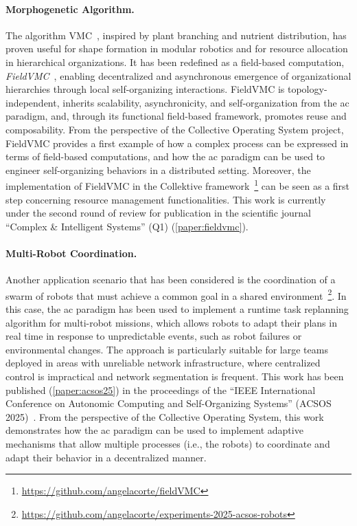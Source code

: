 \documentclass[runningheads]{llncs}
\begin{document}
    \paragraph{Morphogenetic Algorithm.}
    The algorithm \ac{VMC}~\cite{DBLP:conf/gecco/ZahadatHS17},
    inspired by plant branching and nutrient distribution,
    has proven useful for shape formation in modular robotics
    and for resource allocation in hierarchical organizations.
%
    It has been redefined as a field-based computation, \emph{FieldVMC}~\cite{DBLP:conf/acsos/CortecchiaPCC24},
    enabling decentralized and asynchronous emergence of organizational hierarchies
    through local self-organizing interactions.
%
    FieldVMC is topology-independent, inherits scalability, asynchronicity, and self-organization from the \ac{ac} paradigm,
    and, through its functional field-based framework, promotes reuse and composability.
%
    From the perspective of the Collective Operating System project,
    FieldVMC provides a first example of how a complex process can be expressed in terms of field-based computations,
    and how the \ac{ac} paradigm can be used to engineer self-organizing behaviors in a distributed setting.
%
    Moreover,
    the implementation of FieldVMC in the Collektive framework~\footnote{\url{https://github.com/angelacorte/fieldVMC}}
    can be seen as a first step concerning resource management functionalities.
%
    This work is currently under the second round of review for publication in the scientific journal ``Complex \& Intelligent Systems'' (Q1) (\cref{paper:fieldvmc}).

    \paragraph{Multi-Robot Coordination.}
    Another application scenario that has been considered is the coordination of a swarm of robots that must achieve a
    common goal in a shared environment~\footnote{\url{https://github.com/angelacorte/experiments-2025-acsos-robots}}.
%
    In this case,
    the \ac{ac} paradigm has been used to implement a runtime task replanning algorithm for multi-robot missions,
    which allows robots to adapt their plans in real time in response to unpredictable events, such as
    robot failures or environmental changes.
%
    The approach is particularly suitable for large teams deployed in areas with unreliable network infrastructure,
    where centralized control is impractical and network segmentation is frequent.
    This work has been published (\cref{paper:acsos25}) in the proceedings of the ``IEEE International Conference on Autonomic
    Computing and Self-Organizing Systems'' (ACSOS 2025)~\cite{DBLP:conf/acsos/AguzziBCMPPV25}.
%
    From the perspective of the Collective Operating System,
    this work demonstrates how the \ac{ac} paradigm can be used to implement adaptive mechanisms
    that allow multiple processes (i.e., the robots) to coordinate and adapt their behavior in a decentralized manner.
\end{document}

